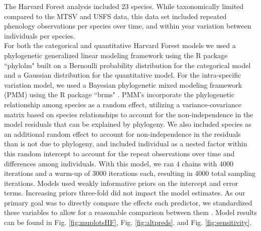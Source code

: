 \documentclass[11pt]{article}
\begin{document}
\noindent The Harvard Forest analysis included 23 species. While taxonomically limited compared to the MTSV and USFS data, this data set included repeated phenology observations per species over time, and within year variation between individuals per species. \\ 

\noindent For both the categorical and quantitative Harvard Forest models we used a phylogenetic generalized linear modeling framework \citep{Ives2010} using the R package ``phylolm" \citep{Ho2014} built on a Bernoulli probability distribution for the categorical model and a Gaussian distribution for the quantitative model. For the intra-specific variation model, we used a Bayesian phylogenetic mixed modeling framework (PMM) \citep{Garamszegi2014} using the R package ``brms" \citep{Burkner2018}. PMM's incorporate the phylogenetic relationship among species as a random effect, utilizing a variance-covariance matrix based on species relationships to account for the non-independence in the model residuals that can be explained by phylogeny. We also included species as an additional random effect to account for non-independence in the residuals than is not due to phylogeny, and included individual as a nested factor within this random intercept to account for the repeat observations over time and differences among individuals. With this model, we ran 4 chains with 4000 iterations and a warm-up of 3000 iterations each, resulting in 4000 total sampling iterations. Models used weakly informative priors on the intercept and error terms. Increasing priors three-fold did not impact the model estimates. As our primary goal was to directly compare the effects each predictor, we standardized these variables to allow for a reasonable comparison between them {\citep{Gelman2007}. Model results can be found in Fig. \ref{fig:muplotsHF}, Fig. \ref{fig:altpreds}. and Fig. \ref{fig:sensitivity}.\\

}
\end{document}
